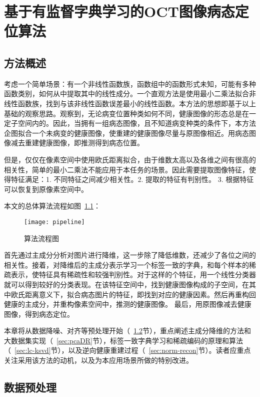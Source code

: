 \chapter{基于有监督字典学习的OCT图像病态定位算法}

\section{方法概述} %
\label{sec:methodOverview}

    考虑一个简单场景：有一个非线性函数族，函数组中的函数形式未知，可能有多种函数类别，如何从中提取其中的线性成分。一个直观方法是使用最小二乘法拟合非线性函数族，找到与该非线性函数误差最小的线性函数。本方法的思想即基于以上基础的观察思路。观察到，无论病变位置种类如何不同，健康图像的形态总是在一定子空间内的。因此，当拥有一组病态图像，且不知道病变种类的条件下，本方法企图拟合一个未病变的健康图像，使重建的健康图像尽量与原图像相近。用病态图像减去重建健康图像，即推测得到病态位置。

    但是，仅仅在像素空间中使用欧氏距离拟合，由于维数太高以及各维之间有很高的相关性，简单的最小二乘法不能应用于本任务的场景。因此需要提取图像特征，使得特征满足：1. 不同特征之间减少相关性。2. 提取的特征有判别性。 3. 根据特征可以恢复到原像素空间中。 

    本文的总体算法流程如图~\ref{fig:pipeline}：
    \begin{figure} %
      \centering
      \texttt{[image: pipeline]}
      \caption{算法流程图}
      \label{fig:pipeline}
    \end{figure}
    首先通过主成分分析对图片进行降维，这一步除了降低维数，还减少了各位之间的相关性。接着，对降维后的主成分表示学习一个标签一致的字典，和每个样本的稀疏表示，使特征具有稀疏性和较强判别性。对于这样的个特征，用一个线性分类器就可以得到较好的分类表现。在该特征空间中，找到健康图像构成的子空间，在其中欧氏距离意义下，拟合病态图片的特征，即找到对应的健康因素。然后再重构回健康的主成分，并重构像素空间中，推测的健康图像。 最后，用原图像减去健康图像，得到病态定位。

    本章将从数据降噪、对齐等预处理开始（~\ref{sec:Preprocessing}节），重点阐述主成分降维的方法和大数据集实现（~\ref{sec:pcaDR}节），标签一致字典学习和稀疏编码的原理和算法（~\ref{sec:lc-ksvd}节），以及逆向健康重建过程（~\ref{sec:norm-recon}节）。读者应重点关注采用该方法的动机，以及为本应用场景所做的特别改进。



\section{数据预处理}
\label{sec:Preprocessing}

